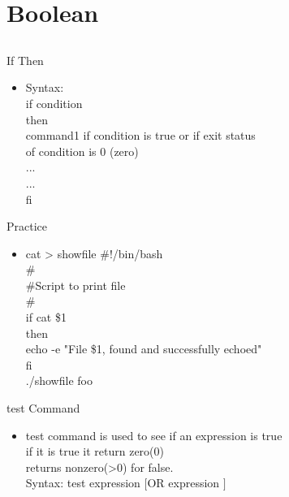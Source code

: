 \documentclass{beamer}
\begin{document}
\section{Boolean}
\subsection{}

\begin{frame}{If Then}
\begin{itemize}
\item Syntax: \\
if condition \\
then \\
command1 if condition is true or if exit status \\
of condition is 0 (zero) \\
... \\
... \\
fi
\end{itemize}
\end{frame}

\begin{frame}{Practice}
\begin{itemize}
\item cat > showfile
\#!/bin/bash \\
\# \\
\#Script to print file \\
\# \\
if cat \$1 \\
then \\
echo -e "File \$1, found and successfully echoed" \\
fi \\
./showfile foo
\end{itemize}
\end{frame}

\begin{frame}{test Command}
\begin{itemize}
\item test command is used to see if an expression is true \\
if it is true it return zero(0) \\
returns nonzero(>0) for false. \\
Syntax: test expression $[$OR expression $]$
\end{itemize}
\end{frame}
\end{document}
